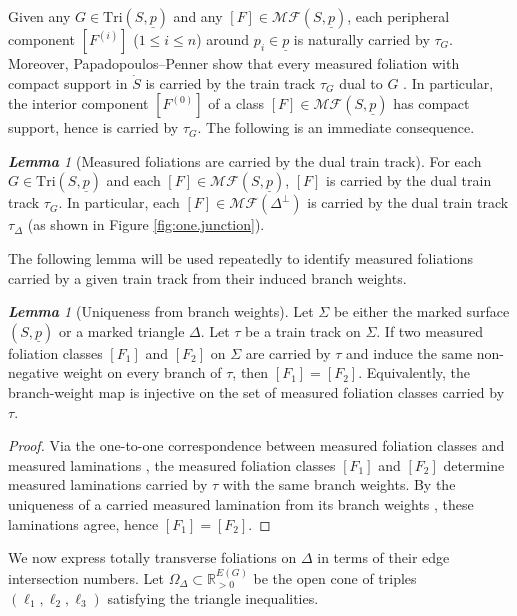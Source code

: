 \documentclass[11pt, letterpaper]{amsart}
\theoremstyle{definition}
\theoremstyle{remark}
\newtheorem{lemma}[theorem]{\rm\bf Lemma}
\newcommand{\up}{\underline{p}}
\newcommand{\Sp}{(S,\up)}
\newcommand{\TSp}{\text{Tri}\Sp}
\newcommand{\cMF}{\mathcal{MF}}
\newcommand{\cMFp}{\mathcal{MF} (S,\up)}
\newcommand{\bR}{\mathbb{R}}
\numberwithin{equation}{section}
\begin{document}
Given any \(G\in\TSp\) and any \([F]\in\cMFp\), each peripheral component \([F^{(i)}]\) (\(1\le i\le n\)) around \(p_i\in\up\) is naturally carried by \(\tau_G\).
Moreover, Papadopoulos--Penner show that every measured foliation with compact support in \(\dot{S}\) is carried by the train track \(\tau_G\) dual to \(G\) \cite[Lemma~2.1]{PP93}.
In particular, the interior component \([F^{(0)}]\) of a class \([F]\in\cMFp\) has compact support, hence is carried by \(\tau_G\).
The following is an immediate consequence. 

\begin{lemma}[Measured foliations are carried by the dual train track]
 \label{lem:int.comp.carried by.dual.tt.}
 For each \(G\in\TSp\) and each \([F]\in\cMFp\), \([F]\) is carried by the dual train track \(\tau_G\). In particular, each $[F]\in \cMF(\Delta^{\perp})$ is carried by the dual train track $\tau_{\Delta}$ (as shown in Figure \ref{fig:one.junction}).
\end{lemma}



The following lemma will be used repeatedly to identify measured foliations carried by a given train track from their induced branch weights.

\begin{lemma}[Uniqueness from branch weights]\label{lem:wtt.ml}
Let \(\Sigma\) be either the marked surface \((S,\underline p)\) or a marked triangle \(\Delta\).
Let \(\tau\) be a train track on \(\Sigma\).
If two measured foliation classes \([F_1]\) and \([F_2]\) on \(\Sigma\) are carried by \(\tau\) and induce the same non-negative weight on every branch of \(\tau\), then \([F_1]=[F_2]\).
Equivalently, the branch-weight map is injective on the set of measured foliation classes carried by \(\tau\).
\end{lemma}

\begin{proof}
Via the one-to-one correspondence between measured foliation classes and measured laminations \cite[Thm.~1]{Lev83},
the measured foliation classes \([F_1]\) and \([F_2]\) determine measured laminations carried by \(\tau\) with the same
branch weights. By the uniqueness of a carried measured lamination from its branch weights
\cite[Lem.~1.7.11]{PH92}, these laminations agree, hence \([F_1]=[F_2]\).
\end{proof}


We now express totally transverse foliations on $\Delta$ in terms of their edge intersection numbers.
Let $\Omega_{\Delta}\subset \bR_{>0}^{E(G)}$ be the open cone of triples $(\ell_1,\ell_2,\ell_3)$ satisfying the triangle inequalities.
\end{document}
